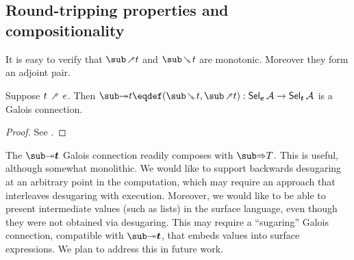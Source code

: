 \subsection{Round-tripping properties and compositionality}

It is easy to verify that $\desugarFwdF{t}$ and $\desugarBwdF{t}$ are monotonic. Moreover they form an adjoint pair.

\begin{theorem}
  \label{thm:surface-language:desugar:gc}
     Suppose $t \desugarFwdR e$. Then ${\desugarGC{t}} \eqdef (\desugarBwdF{t}, \desugarFwdF{t}): \Sel{\raw{e}}{A} \to \Sel{\raw{t}}{A}$ is a Galois connection.
\end{theorem}

\begin{proof}
   \ifappendices See . \else \ProofInSupplementaryMaterial \fi
\end{proof}

\noindent The $\desugarGC{\raw{t}}$ Galois connection readily composes with $\evalGC{T}$. This is useful, although somewhat monolithic. We would like to support backwards desugaring at an arbitrary point in the computation, which may require an approach that interleaves desugaring with execution. Moreover, we would like to be able to present intermediate values (such as lists) in the surface language, even though they were not obtained via desugaring. This may require a ``sugaring'' Galois connection, compatible with $\desugarGC{\raw{t}}$, that embeds values into surface expressions. We plan to address this in future work.
